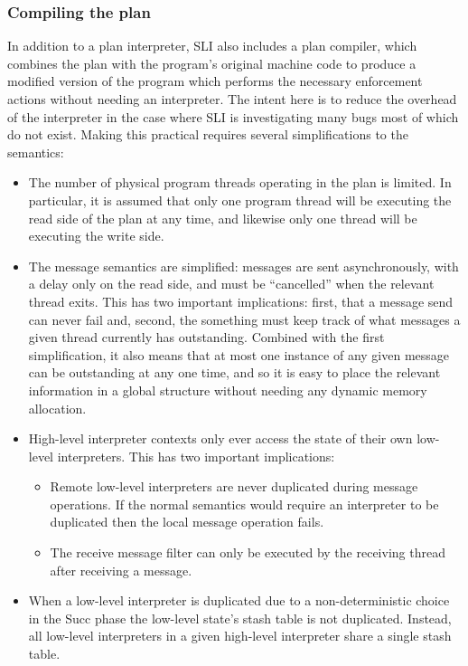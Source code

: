 

\subsubsection{Compiling the plan}

In addition to a plan interpreter, SLI also includes a plan compiler, which combines the plan with the program's original machine code to produce a modified version of the program which performs the necessary enforcement actions without needing an interpreter.
The intent here is to reduce the overhead of the interpreter in the case where SLI is investigating many bugs most of which do not exist.
Making this practical requires several simplifications to the semantics:

\begin{itemize}
\item
  The number of physical program threads operating in the plan is limited.
  In particular, it is assumed that only one program thread will be executing the read side of the plan at any time, and likewise only one thread will be executing the write side.
\item
  The message semantics are simplified: messages are sent asynchronously, with a delay only on the read side, and must be ``cancelled'' when the relevant thread exits.
  This has two important implications: first, that a message send can never fail and, second, the something must keep track of what messages a given thread currently has outstanding.
  Combined with the first simplification, it also means that at most one instance of any given message can be outstanding at any one time, and so it is easy to place the relevant information in a global structure without needing any dynamic memory allocation.
\item
  High-level interpreter contexts only ever access the state of their own low-level interpreters.
  This has two important implications:

  \begin{itemize}
  \item
    Remote low-level interpreters are never duplicated during message operations.
    If the normal semantics would require an interpreter to be duplicated then the local message operation fails.
  \item
    The receive message filter can only be executed by the receiving thread after receiving a message.
  \end{itemize}
\item
  When a low-level interpreter is duplicated due to a non-deterministic choice in the Succ phase the low-level state's stash table is not duplicated.
  Instead, all low-level interpreters in a given high-level interpreter share a single stash table.
\end{itemize}


